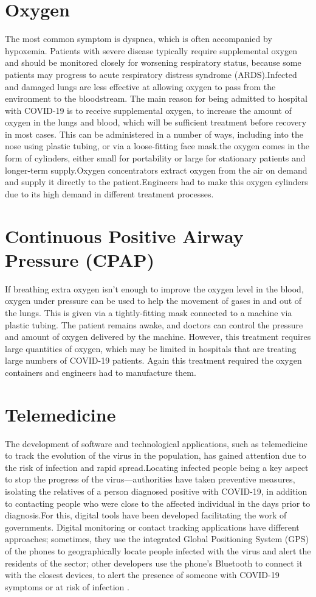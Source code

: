 \documentclass{article}[A4,12pt]
\begin{document}
\section{Oxygen}
The most common symptom is dyspnea, which is often accompanied by hypoxemia. Patients with severe disease typically require supplemental oxygen and should be monitored closely for worsening respiratory status, because some patients may progress to acute respiratory distress syndrome (ARDS).Infected and damaged lungs are less effective at allowing oxygen to pass from the environment to the bloodstream. The main reason for being admitted to hospital with COVID-19 is to receive supplemental oxygen, to increase the amount of oxygen in the lungs and blood, which will be sufficient treatment before recovery in most cases. This can be administered in a number of ways, including into the nose using plastic tubing, or via a loose-fitting face mask.the oxygen comes in the form of cylinders, either small for portability or large for stationary patients and longer-term supply.Oxygen concentrators extract oxygen from the air on demand and supply it directly to the patient.Engineers had to make this oxygen cylinders due to its high demand in different treatment processes.

\section{Continuous Positive Airway Pressure (CPAP)}
If breathing extra oxygen isn’t enough to improve the oxygen level in the blood, oxygen under pressure can be used to help the movement of gases in and out of the lungs. This is given via a tightly-fitting mask connected to a machine via plastic tubing. The patient remains awake, and doctors can control the pressure and amount of oxygen delivered by the machine. However, this treatment requires large quantities of oxygen, which may be limited in hospitals that are treating large numbers of COVID-19 patients. Again this treatment required the oxygen containers and engineers had to manufacture them.

\section{Telemedicine}
The development of software and technological applications, such as telemedicine to track the evolution of the virus in the population, has gained attention due to the risk of infection and rapid spread.Locating infected people being a key aspect to stop the progress of the virus—authorities have taken preventive measures, isolating the relatives of a person diagnosed positive with COVID-19, in addition to contacting people who were close to the affected individual in the days prior to diagnosis.For this, digital tools have been developed facilitating the work of governments. Digital monitoring or contact tracking applications have different approaches; sometimes, they use the integrated Global Positioning System (GPS) of the phones to geographically locate people infected with the virus and alert the residents of the sector; other developers use the phone’s Bluetooth to connect it with the closest devices, to alert the presence of someone with COVID-19 symptoms or at risk of infection .
\end{document}
